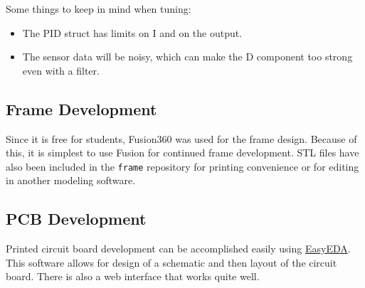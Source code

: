 \documentclass[12pt, titlepage]{article}
\begin{document}
Some things to keep in mind when tuning:
\begin{itemize}
\item The PID struct has limits on I and on the output.
\item The sensor data will be noisy, which can make the D component too strong even with a filter.
\end{itemize}

\subsection{Frame Development}

Since it is free for students, Fusion360 was used for the frame design. Because of this, it is simplest to use Fusion for continued frame development. STL files have also been included in the \texttt{frame} repository for printing convenience or for editing in another modeling software.

\subsection{PCB Development}
Printed circuit board development can be accomplished easily using \href{https://easyeda.com/}{EasyEDA}. This software allows for design of a schematic and then layout of the circuit board. There is also a web interface that works quite well.
\end{document}
